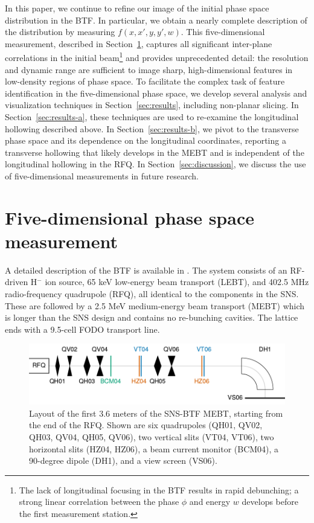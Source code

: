 \documentclass[%
 reprint,
nofootinbib,
 amsmath,amssymb,
 aps,
prstab,
]{revtex4-2}
\begin{document}
In this paper, we continue to refine our image of the initial phase space distribution in the BTF. In particular, we obtain a nearly complete description of the distribution by measuring $f(x, x', y, y', w)$. This five-dimensional measurement, described in Section~\ref{sec:five-dimensional-phase-space-measurement}, captures all significant inter-plane correlations in the initial beam\footnote{The lack of longitudinal focusing in the BTF results in rapid debunching; a strong linear correlation between the phase $\phi$ and energy $w$ develops before the first measurement station.\label{fn:1}} and provides unprecedented detail: the resolution and dynamic range are sufficient to image sharp, high-dimensional features in low-density regions of phase space. To facilitate the complex task of feature identification in the five-dimensional phase space, we develop several analysis and visualization techniques in Section~\ref{sec:results}, including non-planar slicing. In Section~\ref{sec:results-a}, these techniques are used to re-examine the longitudinal hollowing described above. In Section~\ref{sec:results-b}, we pivot to the transverse phase space and its dependence on the longitudinal coordinates, reporting a transverse hollowing that likely develops in the MEBT and is independent of the longitudinal hollowing in the RFQ. In Section~\ref{sec:discussion}, we discuss the use of five-dimensional measurements in future research. 



\section{Five-dimensional phase space measurement}\label{sec:five-dimensional-phase-space-measurement}

A detailed description of the BTF is available in \cite{Zhang2020}. The system consists of an RF-driven H$^-$ ion source, 65 keV low-energy beam transport (LEBT), and 402.5 MHz radio-frequency quadrupole (RFQ), all identical to the components in the SNS. These are followed by a 2.5 MeV medium-energy beam transport (MEBT) which is longer than the SNS design and contains no re-bunching cavities. The lattice ends with a 9.5-cell FODO transport line.

\begin{figure}
    \centering
    \includegraphics[width=\columnwidth]{fig_diagram.pdf}
    \caption{Layout of the first 3.6 meters of the SNS-BTF MEBT, starting from the end of the RFQ. Shown are six quadrupoles (QH01, QV02, QH03, QV04, QH05, QV06), two vertical slits (VT04, VT06), two horizontal slits (HZ04, HZ06), a beam current monitor (BCM04), a 90-degree dipole (DH1), and a view screen (VS06).}
    \label{fig:layout}
\end{figure}
\end{document}

